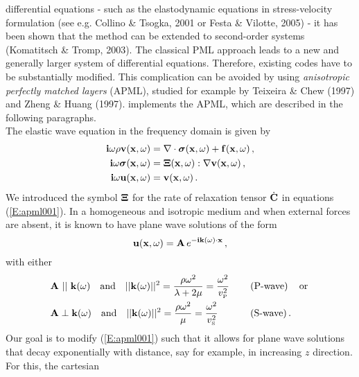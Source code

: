 differential equations - such as the elastodynamic equations in
stress-velocity formulation (see e.g. Collino \& Tsogka, 2001 or
Festa \& Vilotte, 2005) - it has been shown that the method can be
extended to second-order systems (Komatitsch \& Tromp, 2003). The
classical PML approach leads to a new and generally larger system of
differential equations. Therefore, existing codes have to be
substantially modified. This complication can be avoided by using
\emph{anisotropic perfectly matched layers} (APML), studied for
example by Teixeira \& Chew (1997) and Zheng \& Huang (1997). \SES implements the APML, which are described in the following paragraphs.\\[5pt]
The elastic wave equation in the frequency domain is given by
\begin{subequations}\label{E:apml001}
\begin{align}
\mathbf{i}\omega \rho \mathbf{v}(\mathbf{x},\omega) &= \nabla\cdot\boldsymbol{\sigma}(\mathbf{x},
\omega) + \mathbf{f}(\mathbf{x},\omega)\,,\label{E:apml001a}\\
\mathbf{i}\omega \boldsymbol{\sigma}(\mathbf{x},\omega) &=
\boldsymbol{\Xi}(\mathbf{x},\omega):\nabla \mathbf{v}(\mathbf{x},\omega)\,,\label{E:apml001b}\\
\mathbf{i}\omega \mathbf{u}(\mathbf{x},\omega) &=
\mathbf{v}(\mathbf{x},\omega)\,.\label{E:apml001c}
\end{align}
\end{subequations}
We introduced the symbol $\boldsymbol{\Xi}$ for the rate of relaxation tensor
$\dot{\mathbf{C}}$ in equations (\ref{E:apml001}). In a homogeneous and
isotropic medium and when external forces are absent, it is known to
have plane wave solutions of the form
\begin{equation}\label{E:apml002}
\mathbf{u}(\mathbf{x},\omega)=\mathbf{A}\,e^{-\mathbf{i}\mathbf{k}(\omega)\cdot \mathbf{x}}\,,
\end{equation}
with either
\begin{subequations}
\begin{align}
&\mathbf{A}\,\, ||\,\, \mathbf{k}(\omega)\quad\text{and}\quad
||\mathbf{k}(\omega)||^2=\frac{\rho\omega^2}{\lambda+2\mu}=\frac{\omega^2}{v_\text{\tiny{P}}^2}\,\quad&&\text{(P-wave)}\,\quad\text{or}\,\label{E:apml003}\\
&\mathbf{A}\perp\mathbf{k}(\omega)\quad\text{and}\quad
||\mathbf{k}(\omega)||^2=\frac{\rho\omega^2}{\mu}=\frac{\omega^2}{v_\text{\tiny{S}}^2}\,\quad&&\text{(S-wave)}\,.\label{E:apml004}
\end{align}
\end{subequations}
Our goal is to modify (\ref{E:apml001}) such that it allows for
plane wave solutions that decay exponentially with distance, say for
example, in increasing $z$ direction. For this, the cartesian
